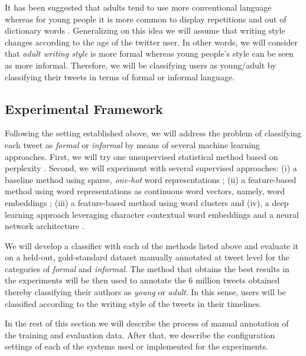 \documentclass[information,article,submit,moreauthors,pdftex,10pt,a4paper]{Definitions/mdpi}
\begin{document}
It has been suggested that adults tend to use more conventional language \cite{nguyen2013old} whereas for young people it is more common to display repetitions and out of dictionary words \citep{rao2010classifying,rosenthal2011age,morgan2017predicting}. Generalizing on this idea we will assume that writing style changes according to the age of the twitter user. In other words, we will consider that \emph{adult writing style} is more formal whereas young people's style can be seen as more informal. Therefore, we will be classifying users as young/adult by classifying their tweets in terms of formal or informal language.

\subsection{Experimental Framework}\label{sec:exper-fram}

Following the setting established above, we will address the problem of classifying each tweet as \emph{formal} or \emph{informal} by means of several machine learning approaches. First, we will try one unsupervised statistical method based on perplexity \cite{gamallo2017language}. Second, we will experiment with several supervised approaches: (i) a baseline method using sparse, \emph{one-hot} word representations \cite{pedregosa2011scikit}; (ii) a feature-based method using word representations as continuous word vectors, namely, word embeddings \cite{mikolov2013distributed,pennington-etal-2014-glove,mikolov-etal-2018-advances}; (iii) a feature-based method using word clusters \cite{agerri2016robust,agerri2019language} and (iv), a deep learning approach leveraging character contextual word embeddings and a neural network architecture \cite{akbik2018contextual}.

We will develop a classifier with each of the methods listed above and evaluate it on a held-out, gold-standard dataset manually annotated at tweet level for the categories of \emph{formal} and \emph{informal}. The method that obtains the best results in the experiments will be then used to annotate the 6 million tweets obtained thereby classifying their authors as \emph{young} or \emph{adult}. In this sense, users will be classified according to the writing style of the tweets in their timelines.

In the rest of this section we will describe the process of manual annotation of the training and evaluation data. After that, we describe the configuration settings of each of the systems used or implemented for the experiments.
\end{document}
